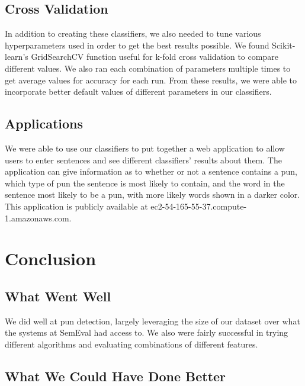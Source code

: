 \documentclass{article}
\begin{document}
\subsection{Cross Validation}
In addition to creating these classifiers, we also needed to tune various hyperparameters used in order to get the best results possible. We found Scikit-learn's GridSearchCV function useful for k-fold cross validation to compare different values. We also ran each combination of parameters multiple times to get average values for accuracy for each run. From these results, we were able to incorporate better default values of different parameters in our classifiers. 

\subsection{Applications}
We were able to use our classifiers to put together a web application to allow users to enter sentences and see different classifiers' results about them. The application can give information as to whether or not a sentence contains a pun, which type of pun the sentence is most likely to contain, and the word in the sentence most likely to be a pun, with more likely words shown in a darker color. This application is publicly available at ec2-54-165-55-37.compute-1.amazonaws.com.


\section{Conclusion}
\label{conclusion}

\subsection{What Went Well}

We did well at pun detection, largely leveraging the size of our dataset over
what the systems at SemEval had access to. We also were fairly successful in
trying different algorithms and evaluating combinations of different features. 

\subsection{What We Could Have Done Better}
\end{document}
